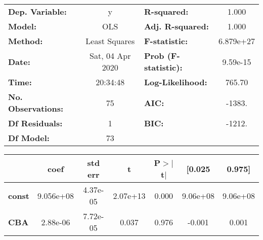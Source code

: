 \begin{center}
\begin{tabular}{lclc}
\toprule
\textbf{Dep. Variable:}    &        y         & \textbf{  R-squared:         } &     1.000   \\
\textbf{Model:}            &       OLS        & \textbf{  Adj. R-squared:    } &     1.000   \\
\textbf{Method:}           &  Least Squares   & \textbf{  F-statistic:       } & 6.879e+27   \\
\textbf{Date:}             & Sat, 04 Apr 2020 & \textbf{  Prob (F-statistic):} &  9.59e-15   \\
\textbf{Time:}             &     20:34:48     & \textbf{  Log-Likelihood:    } &    765.70   \\
\textbf{No. Observations:} &          75      & \textbf{  AIC:               } &    -1383.   \\
\textbf{Df Residuals:}     &           1      & \textbf{  BIC:               } &    -1212.   \\
\textbf{Df Model:}         &          73      & \textbf{                     } &             \\
\bottomrule
\end{tabular}
\begin{tabular}{lcccccc}
               & \textbf{coef} & \textbf{std err} & \textbf{t} & \textbf{P$>$$|$t$|$} & \textbf{[0.025} & \textbf{0.975]}  \\
\midrule
\textbf{const} &    9.056e+08  &     4.37e-05     &  2.07e+13  &         0.000        &     9.06e+08    &     9.06e+08     \\
\textbf{CBA}    &     2.88e-06  &     7.72e-05     &     0.037  &         0.976        &       -0.001    &        0.001     \\
\end{tabular}
\end{center}